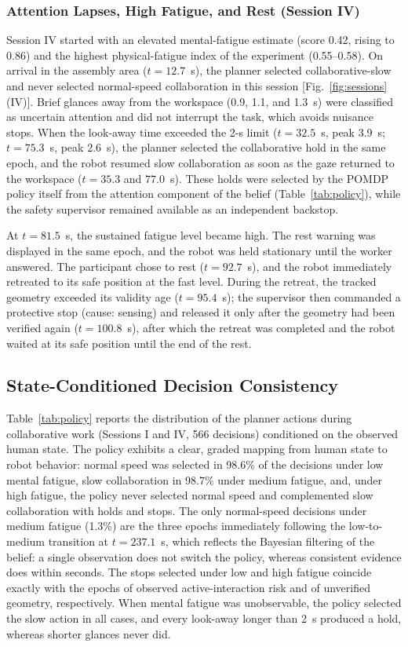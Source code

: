 \subsubsection{Attention Lapses, High Fatigue, and Rest (Session IV)}
Session IV started with an elevated mental-fatigue estimate (score 0.42, rising to 0.86) and the highest
physical-fatigue index of the experiment (0.55--0.58). On arrival in the assembly area ($t = 12.7$~s), the
planner selected collaborative-slow and never selected normal-speed collaboration in this session
[Fig.~\ref{fig:sessions}(IV)]. Brief glances away from the workspace (0.9, 1.1, and 1.3~s) were classified as
uncertain attention and did not interrupt the task, which avoids nuisance stops. When the look-away time
exceeded the 2-s limit ($t = 32.5$~s, peak 3.9~s; $t = 75.3$~s, peak 2.6~s), the planner selected the
collaborative hold in the same epoch, and the robot resumed slow collaboration as soon as the gaze returned
to the workspace ($t = 35.3$ and $77.0$~s). These holds were selected by the POMDP policy itself from the
attention component of the belief (Table~\ref{tab:policy}), while the safety supervisor remained available as
an independent backstop.

At $t = 81.5$~s, the sustained fatigue level became high. The rest warning was displayed in the same
epoch, and the robot was held stationary until the worker answered. The participant chose to rest
($t = 92.7$~s), and the robot immediately retreated to its safe position at the fast level. During the
retreat, the tracked geometry exceeded its validity age ($t = 95.4$~s); the supervisor then commanded a
protective stop (cause: sensing) and released it only after the geometry had been verified again
($t = 100.8$~s), after which the retreat was completed and the robot waited at its safe position until the
end of the rest.

\subsection{State-Conditioned Decision Consistency}
\label{sec:policy_consistency}

Table~\ref{tab:policy} reports the distribution of the planner actions during collaborative work (Sessions I
and IV, 566 decisions) conditioned on the observed human state. The policy exhibits a clear, graded mapping
from human state to robot behavior: normal speed was selected in 98.6\% of the decisions under low mental
fatigue, slow collaboration in 98.7\% under medium fatigue, and, under high fatigue, the policy never
selected normal speed and complemented slow collaboration with holds and stops. The only normal-speed
decisions under medium fatigue (1.3\%) are the three epochs immediately following the low-to-medium
transition at $t = 237.1$~s, which reflects the Bayesian filtering of the belief: a single observation does
not switch the policy, whereas consistent evidence does within seconds. The stops selected under low and
high fatigue coincide exactly with the epochs of observed active-interaction risk and of unverified
geometry, respectively. When mental fatigue was unobservable, the policy selected the slow action in all
cases, and every look-away longer than 2~s produced a hold, whereas shorter glances never did.

